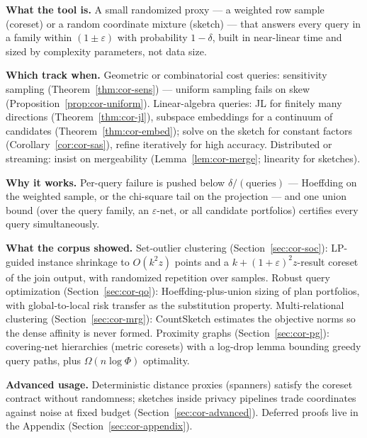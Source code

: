 \begin{recap}
\item \textbf{What the tool is.} A small randomized proxy --- a
  weighted row sample (coreset) or a random coordinate mixture
  (sketch) --- that answers every query in a family within
  $(1\pm\varepsilon)$ with probability $1-\delta$, built in
  near-linear time and sized by complexity parameters, not data size.
\item \textbf{Which track when.} Geometric or combinatorial cost
  queries: sensitivity sampling (Theorem~\ref{thm:cor-sens}) ---
  uniform sampling fails on skew
  (Proposition~\ref{prop:cor-uniform}). Linear-algebra queries: JL for
  finitely many directions (Theorem~\ref{thm:cor-jl}), subspace
  embeddings for a continuum of candidates
  (Theorem~\ref{thm:cor-embed}); solve on the sketch for constant
  factors (Corollary~\ref{cor:cor-sas}), refine iteratively for high
  accuracy. Distributed or streaming: insist on mergeability
  (Lemma~\ref{lem:cor-merge}; linearity for sketches).
\item \textbf{Why it works.} Per-query failure is pushed below
  $\delta/(\text{queries})$ --- Hoeffding on the weighted sample, or
  the chi-square tail on the projection --- and one union bound (over
  the query family, an $\varepsilon$-net, or all candidate portfolios)
  certifies every query simultaneously.
\item \textbf{What the corpus showed.} Set-outlier clustering
  (Section~\ref{sec:cor-soc}): LP-guided instance shrinkage to
  $O(k^2z)$ points and a $k + (1+\varepsilon)^2 z$-result coreset of
  the join output, with randomized repetition over samples. Robust
  query optimization (Section~\ref{sec:cor-qo}): Hoeffding-plus-union
  sizing of plan portfolios, with global-to-local risk transfer as the
  substitution property. Multi-relational clustering
  (Section~\ref{sec:cor-mrg}): CountSketch estimates the objective
  norms so the dense affinity is never formed. Proximity graphs
  (Section~\ref{sec:cor-pg}): covering-net hierarchies (metric
  coresets) with a log-drop lemma bounding greedy query paths, plus
  $\Omega(n\log\Phi)$ optimality.
\item \textbf{Advanced usage.} Deterministic distance proxies
  (spanners) satisfy the coreset contract without randomness; sketches
  inside privacy pipelines trade coordinates against noise at fixed
  budget (Section~\ref{sec:cor-advanced}). Deferred proofs live in the
  Appendix (Section~\ref{sec:cor-appendix}).
\end{recap}

